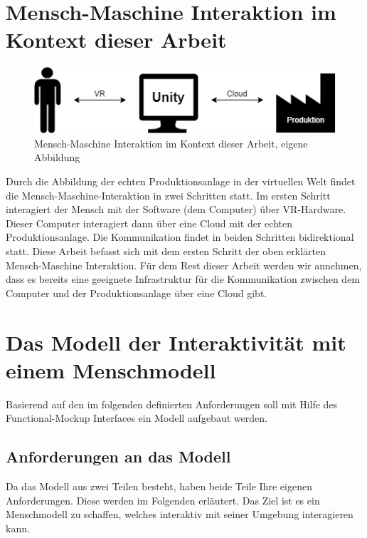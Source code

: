 \section{Mensch-Maschine Interaktion im Kontext dieser Arbeit}\label{sec:MMInteraktion}
\begin{figure}[h]
	\centering
	\includegraphics[width=0.7\linewidth]{Bilder/A19_MMI}
	\caption{Mensch-Maschine Interaktion im Kontext dieser Arbeit, eigene Abbildung}
	\label{fig:MMI}
\end{figure}
\noindent Durch die Abbildung der echten Produktionsanlage in der virtuellen Welt findet die Mensch-Maschine-Interaktion in zwei Schritten statt. Im ersten Schritt interagiert der Mensch mit der Software (dem Computer) über VR-Hardware. Dieser Computer interagiert dann über eine Cloud mit der echten Produktionsanlage. Die Kommunikation findet in beiden Schritten bidirektional statt.
\newline\newline
Diese Arbeit befasst sich mit dem ersten Schritt der oben erklärten Mensch-Maschine Interaktion. Für dem Rest dieser Arbeit werden wir annehmen, dass es bereits eine geeignete Infrastruktur für die Kommunikation zwischen dem Computer und der Produktionsanlage über eine Cloud gibt.

\section{Das Modell der Interaktivität mit einem Menschmodell}\label{sec:ModellAufbau}
Basierend auf den im folgenden definierten Anforderungen soll mit Hilfe des Functional-Mockup Interfaces ein Modell aufgebaut werden.

\subsection{Anforderungen an das Modell}\label{sec:AnforderungenKonzept}
Da das Modell aus zwei Teilen besteht, haben beide Teile Ihre eigenen Anforderungen. Diese werden im Folgenden erläutert. Das Ziel ist es ein Menschmodell zu schaffen, welches interaktiv mit seiner Umgebung interagieren kann.

